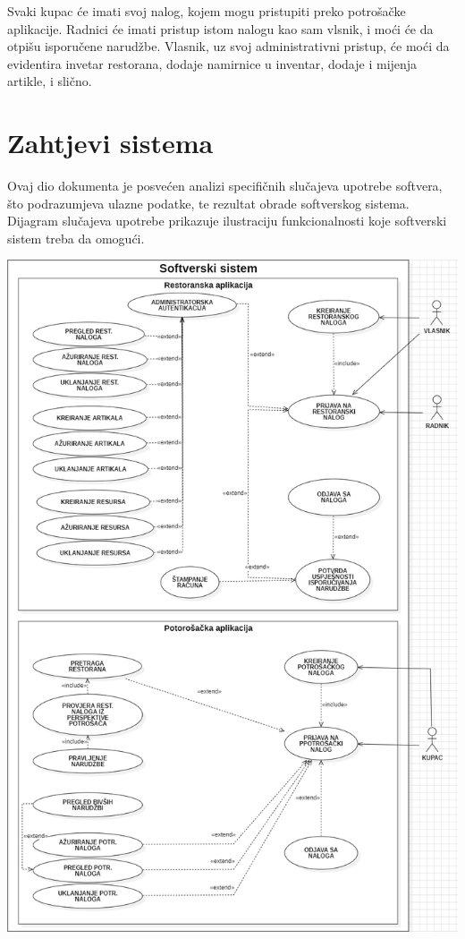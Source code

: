 \documentclass{scrreprt}
\begin{document}
Svaki kupac će imati svoj nalog, kojem mogu pristupiti preko potrošačke aplikacije.
Radnici će imati pristup istom nalogu kao sam vlsnik, i moći će da otpišu isporučene narudžbe.
Vlasnik, uz svoj administrativni pristup, će moći da evidentira invetar restorana,
dodaje namirnice u inventar, dodaje i mijenja artikle, i slično.

\section{Zahtjevi sistema}
Ovaj dio dokumenta je posvećen analizi specifičnih slučajeva upotrebe softvera,
što podrazumjeva ulazne podatke, te rezultat obrade softverskog sistema.
Dijagram slučajeva upotrebe prikazuje ilustraciju funkcionalnosti koje
softverski sistem treba da omogući.

\begin{center}
	\includegraphics[width=14.5cm]{./img/zahtjevi_sistema.png}
\end{center}
\end{document}
